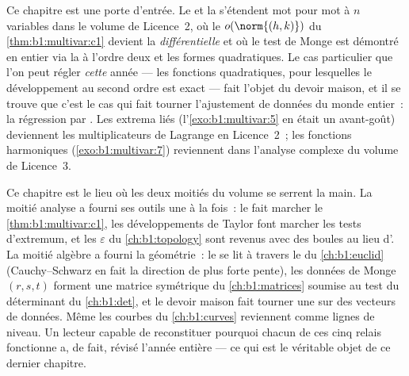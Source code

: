 \begin{remark}
\label{rem:b1:multivar:whereused}
Ce chapitre est une porte d'entrée. Le  et la  s'étendent mot pour mot à $n$ variables dans le volume de
Licence~2, où le $o(\norm{(h,k)})$ du \cref{thm:b1:multivar:c1}
devient la \emph{différentielle} et où le test de Monge est
démontré en entier via la  à l'ordre deux et les
formes quadratiques. Le cas particulier que l'on peut régler
\emph{cette} année --- les fonctions quadratiques, pour lesquelles
le développement au second ordre est exact --- fait l'objet du
devoir maison, et il se trouve que c'est le cas qui fait tourner
l'ajustement de données du monde entier~: la régression par
. Les extrema liés (l'\cref{exo:b1:multivar:5} en
était un avant-goût) deviennent les multiplicateurs de Lagrange en
Licence~2~; les fonctions harmoniques
(\cref{exo:b1:multivar:7}) reviennent dans l'analyse complexe du
volume de Licence~3.
\end{remark}

\begin{remark}
\label{rem:b1:multivar:perspectives}
Ce chapitre est le lieu où les deux moitiés du volume se serrent
la main. La moitié analyse a fourni ses outils une  à la
fois~: le  fait marcher
le \cref{thm:b1:multivar:c1}, les développements de Taylor font
marcher les tests d'extremum, et les $\varepsilon$ du
\cref{ch:b1:topology} sont revenus avec des boules au lieu
d'. La moitié algèbre a fourni la géométrie~: le
 se lit à travers le  du
\cref{ch:b1:euclid} (Cauchy--Schwarz en fait la direction de plus
forte pente), les données de Monge $(r, s, t)$ forment une matrice
symétrique du \cref{ch:b1:matrices} soumise au test du
déterminant du \cref{ch:b1:det}, et le devoir maison fait tourner
une  sur des vecteurs de données. Même les
courbes du \cref{ch:b1:curves} reviennent comme lignes de niveau.
Un lecteur capable de reconstituer pourquoi chacun de ces cinq
relais fonctionne a, de fait, révisé l'année entière --- ce qui
est le véritable objet de ce dernier chapitre.
\end{remark}

